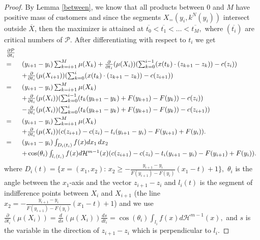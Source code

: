 \documentclass[12pt,reqno]{amsart}
\begin{document}
\begin{proof}
 
 By Lemma \ref{between}, we know that all products between $0$ and $M$ have positive mass  of customers and since the segments $X_=(y_i,k^N(y_i))$ intersect outside $\overline{X}$, then the maximizer is attained at $\overline{t_0}<\overline{t_1}<\dots<\overline{t_M},$ where $(\overline{t_i})$ are critical numbers of $\mathcal{P}.$ After differentiating with respect 
 to $t_i$ we get 
 \begin{equation}\hspace{-2pt}
 \begin{array}{ll}
\frac{\partial\mathcal{P}}{\partial t_i}\vspace{3pt}\\
=&(y_{i+1}-y_i)\sum_{k=i+1}^M\mu( X_k)+\frac{\partial}{\partial t_i}(\mu( X_i))(\sum_{k=0}^{i-1}(x(t_{k})\cdot (z_{k+1}-z_{k}))-c(z_i))\vspace{3pt}\\
&+\frac{\partial}{\partial t_i}(\mu( X_{i+1}))(\sum_{k=0}^{i}(x(t_{k})\cdot (z_{k+1}-z_{k}))-c(z_{i+1}))\vspace{3pt}\\
=&(y_{i+1}-y_i)\sum_{k=i+1}^M\mu( X_k)\vspace{3pt}\\
&+\frac{\partial}{\partial t_i}(\mu( X_i))(\sum_{k=0}^{i-1}(t_{k} (y_{k+1}-y_{k})+F(y_{k+1})-F(y_{k}))-c(z_i))\vspace{3pt}\\
&-\frac{\partial}{\partial t_i}(\mu( X_i))(\sum_{k=0}^{i}(t_{k} (y_{k+1}-y_{k})+F(y_{k+1})-F(y_{k}))-c(z_{i+1}))\vspace{3pt}\\
=&(y_{i+1}-y_i)\sum_{k=i+1}^M\mu( X_k)\vspace{3pt}\\
&+\frac{\partial}{\partial t_i}(\mu( X_i))(c(z_{i+1})-c(z_i)-t_i(y_{i+1}-y_i)-F(y_{i+1})+F(y_i)).\vspace{3pt}\\
=&(y_{i+1}-y_i)\int_{D_i(t_i)}f(x)dx_1\,dx_2\vspace{3pt}\\
&+\cos(\theta_i)\int_{l_i(t_i)}f(x)d\mathcal H^{m-1}(x)(c(z_{i+1})-c(z_i)-t_i(y_{i+1}-y_i)-F(y_{i+1})+F(y_i))\label{tbar}.
\end{array}
\end{equation}
where $D_i(t)=\{x=(x_1,x_2):\, x_2\ge-\frac{y_{i+1}-y_i}{F(y_{i+1})-F(y_i)}(x_1-t)+1\},$  $\theta_i$ is the angle between the $x_1$-axis and the vector $z_{i+1}-z_i$ and $l_i(t)$ is the segment of indifference points between $ X_i$ and $ X_{i+1}$ (the line $x_2=-\frac{y_{i+1}-y_i}{F(y_{i+1})-F(y_i)}(x_1-t)+1$) and we use  $\frac{\partial}{\partial t_i}(\mu( X_i))=\frac{d}{ds}(\mu( X_i))\frac{ds}{dt_i}=\cos(\theta_i)\int_{l_i}f(x)d\mathcal H^{m-1}(x),$ and $s$ is the variable in the direction of $z_{i+1}-z_i$ which is perpendicular to $l_i.$  


\end{proof}
\end{document}
